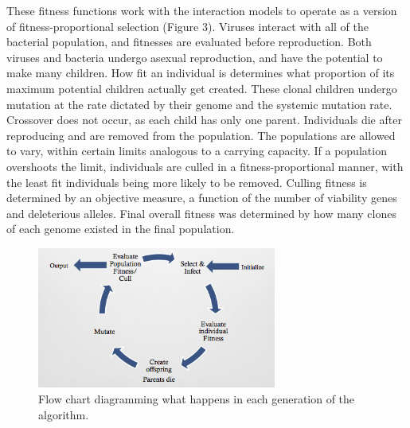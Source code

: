 \documentclass[11pt, oneside]{article}
\begin{document}
These fitness functions work with the interaction models to operate as a version of fitness-proportional selection (Figure 3). Viruses interact with all of the bacterial population, and fitnesses are evaluated before reproduction. Both viruses and bacteria undergo asexual reproduction, and have the potential to make many children. How fit an individual is determines what proportion of its maximum potential children actually get created. These clonal children undergo mutation at the rate dictated by their genome and the systemic mutation rate. Crossover does not occur, as each child has only one parent. Individuals die after reproducing and are removed from the population. The populations are allowed to vary, within certain limits analogous to a carrying capacity. If a population overshoots the limit, individuals are culled in a fitness-proportional manner, with the least fit individuals being more likely to be removed. Culling fitness is determined by an objective measure, a function of the number of viability genes and deleterious alleles. Final overall fitness was determined by how many clones of each genome existed in the final population.

\begin{figure}[H]
	\centering
	\includegraphics[width=0.7\textwidth]{flowchart.png}
	\caption{Flow chart diagramming what happens in each generation of the algorithm.}
\end{figure}
\end{document}
